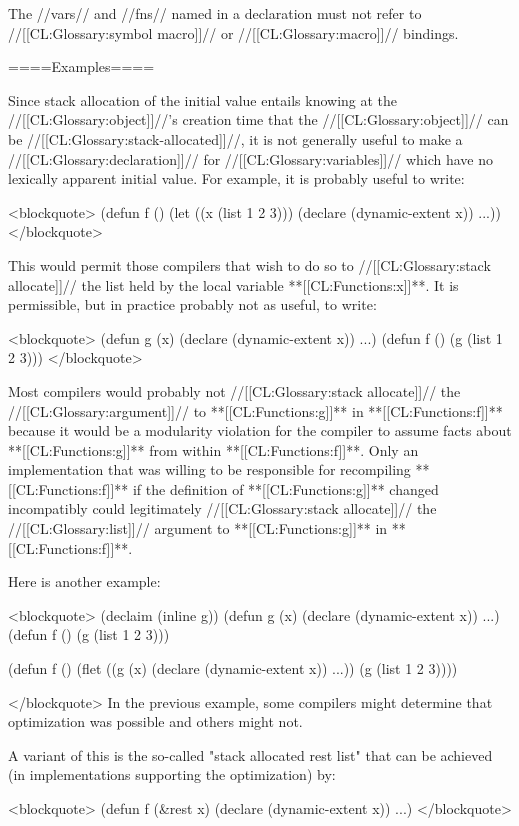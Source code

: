 The //vars// and //fns// named in a  declaration must not refer to //[[CL:Glossary:symbol macro]]// or //[[CL:Glossary:macro]]// bindings.

====Examples====

Since stack allocation of the initial value entails knowing at the //[[CL:Glossary:object]]//'s creation time that the //[[CL:Glossary:object]]// can be //[[CL:Glossary:stack-allocated]]//, it is not generally useful to make a  //[[CL:Glossary:declaration]]// for //[[CL:Glossary:variables]]// which have no lexically apparent initial value. For example, it is probably useful to write:

<blockquote> (defun f () (let ((x (list 1 2 3))) (declare (dynamic-extent x)) ...)) </blockquote>

This would permit those compilers that wish to do so to //[[CL:Glossary:stack allocate]]// the list held by the local variable **[[CL:Functions:x]]**. It is permissible, but in practice probably not as useful, to write:

<blockquote> (defun g (x) (declare (dynamic-extent x)) ...) (defun f () (g (list 1 2 3))) </blockquote>

Most compilers would probably not //[[CL:Glossary:stack allocate]]// the //[[CL:Glossary:argument]]// to **[[CL:Functions:g]]** in **[[CL:Functions:f]]** because it would be a modularity violation for the compiler to assume facts about **[[CL:Functions:g]]** from within **[[CL:Functions:f]]**. Only an implementation that was willing to be responsible for recompiling **[[CL:Functions:f]]** if the definition of **[[CL:Functions:g]]** changed incompatibly could legitimately //[[CL:Glossary:stack allocate]]// the //[[CL:Glossary:list]]// argument to **[[CL:Functions:g]]** in **[[CL:Functions:f]]**.

Here is another example:

<blockquote> (declaim (inline g)) (defun g (x) (declare (dynamic-extent x)) ...) (defun f () (g (list 1 2 3)))

(defun f () (flet ((g (x) (declare (dynamic-extent x)) ...)) (g (list 1 2 3))))

</blockquote> In the previous example, some compilers might determine that optimization was possible and others might not.

A variant of this is the so-called "stack allocated rest list" that can be achieved (in implementations supporting the optimization) by:

<blockquote> (defun f (&rest x) (declare (dynamic-extent x)) ...) </blockquote>


